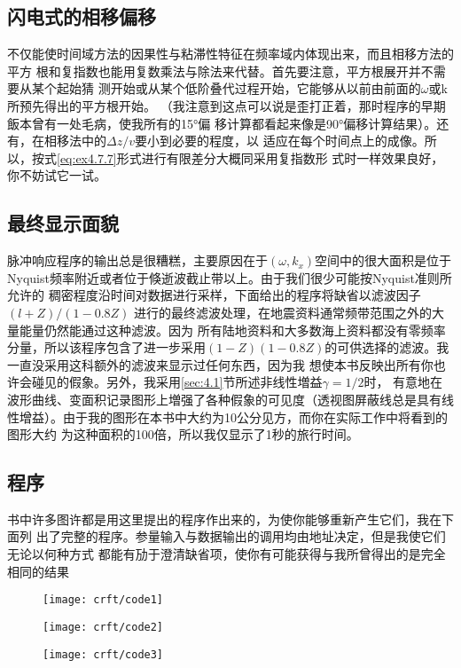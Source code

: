 \subsection{闪电式的相移偏移}
\label{sec:4.7.5}

不仅能使时间域方法的因果性与粘滞性特征在频率域内体现出来，而且相移方法的平方
根和复指数也能用复数乘法与除法来代替。首先要注意，平方根展开并不需要从某个起始猜
测开始或从某个低阶叠代过程开始，它能够从以前由前面的$\omega$或k所预先得出的平方根开始。
（我注意到这点可以说是歪打正着，那时程序的早期飯本曾有一处毛病，使我所有的15°偏
移计算都看起来像是90°偏移计算结果）。还有，在相移法中的$\Delta z/v$要小到必要的程度，以
适应在每个时间点上的成像。所以，按式\ref{eq:ex4.7.7}形式进行有限差分大概同采用复指数形
式时一样效果良好，你不妨试它一试。

\subsection{最终显示面貌}
\label{sec:4.7.6}

脉冲响应程序的输出总是很糟糕，主要原因在于$(\omega,k_x)$空间中的很大面积是位于
Nyquist频率附近或者位于倏逝波截止带以上。由于我们很少可能按Nyquist准则所允许的
稠密程度沿时间对数据进行采样，下面给出的程序将缺省以滤波因子$(l + Z)/( 1
-0.8Z)$
进行的最终滤波处理，在地震资料通常频带范围之外的大量能量仍然能通过这种滤波。因为
所有陆地资料和大多数海上资料都没有零频率分量，所以该程序包含了进一步采用$(1
-Z)(1-0.8Z)$的可供选择的滤波。我一直没采用这科额外的滤波来显示过任何东西，因为我
想使本书反映出所有你也许会碰见的假象。另外，我采用\ref{sec:4.1}节所述非线性増益$\gamma=1/2$时，
有意地在波形曲线、变面积记录图形上増强了各种假象的可见度（透视图屏蔽线总是具有线
性增益）。由于我的图形在本书中大约为10公分见方，而你在实际工作中将看到的图形大约
为这种面积的100倍，所以我仅显示了1秒的旅行时间。



\subsection{程序}
\label{sec:4.7.7}

书中许多图许都是用这里提出的程序作出来的，为使你能够重新产生它们，我在下面列
出了完整的程序。参量输入与数据输出的调用均由地址决定，但是我使它们无论以何种方式
都能有劢于澄清缺省项，使你有可能获得与我所曾得出的是完全相同的结果

\begin{figure}[H]
\centering
\texttt{[image: crft/code1]}
\label{fig:crft/code1}
\end{figure}
\begin{figure}[H]
\centering
\texttt{[image: crft/code2]}
\label{fig:crft/code2}
\end{figure}
\begin{figure}[H]
\centering
\texttt{[image: crft/code3]}
\label{fig:crft/code3}
\end{figure}
